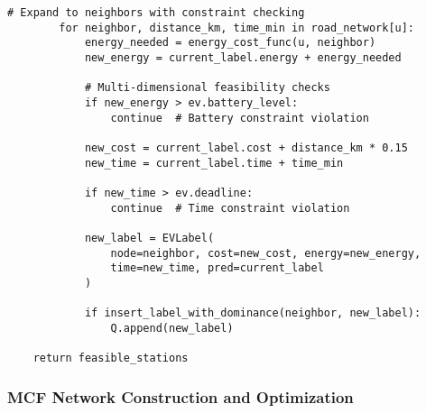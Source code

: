 \documentclass[12pt,a4paper]{article}
\begin{document}
\begin{lstlisting}[caption=Complete ECSP Implementation,label=lst:ecsp]
        # Expand to neighbors with constraint checking
        for neighbor, distance_km, time_min in road_network[u]:
            energy_needed = energy_cost_func(u, neighbor)
            new_energy = current_label.energy + energy_needed
            
            # Multi-dimensional feasibility checks
            if new_energy > ev.battery_level:
                continue  # Battery constraint violation
                
            new_cost = current_label.cost + distance_km * 0.15
            new_time = current_label.time + time_min
            
            if new_time > ev.deadline:
                continue  # Time constraint violation
                
            new_label = EVLabel(
                node=neighbor, cost=new_cost, energy=new_energy,
                time=new_time, pred=current_label
            )
            
            if insert_label_with_dominance(neighbor, new_label):
                Q.append(new_label)
    
    return feasible_stations
\end{lstlisting}

\subsubsection{MCF Network Construction and Optimization}
\end{document}
